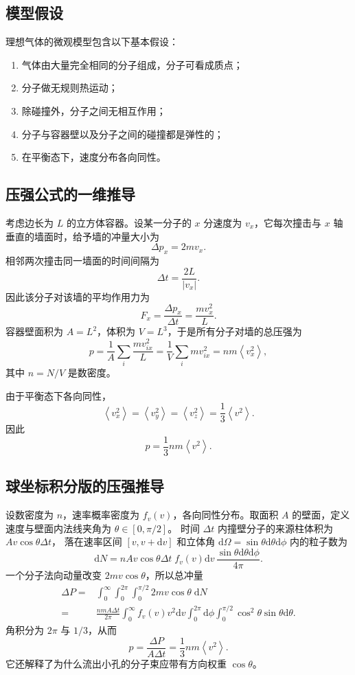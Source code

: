 \documentclass[11pt,a4paper,openany]{ctexbook}
\newcommand{\dd}{\mathrm d}
\newcommand{\avg}[1]{\left\langle #1\right\rangle}
\begin{document}
\subsection*{模型假设}
理想气体的微观模型包含以下基本假设：
\begin{enumerate}[leftmargin=2.3em]
\item 气体由大量完全相同的分子组成，分子可看成质点；
\item 分子做无规则热运动；
\item 除碰撞外，分子之间无相互作用；
\item 分子与容器壁以及分子之间的碰撞都是弹性的；
\item 在平衡态下，速度分布各向同性。
\end{enumerate}

\subsection*{压强公式的一维推导}
考虑边长为 $L$ 的立方体容器。设某一分子的 $x$ 分速度为 $v_x$，它每次撞击与 $x$ 轴垂直的墙面时，给予墙的冲量大小为
\[
\Delta p_x=2mv_x.
\]
相邻两次撞击同一墙面的时间间隔为
\[
\Delta t=\frac{2L}{|v_x|}.
\]
因此该分子对该墙的平均作用力为
\[
F_x=\frac{\Delta p_x}{\Delta t}=\frac{mv_x^2}{L}.
\]
容器壁面积为 $A=L^2$，体积为 $V=L^3$，于是所有分子对墙的总压强为
\[
p=\frac1A\sum_i\frac{mv_{ix}^2}{L}
=\frac1V\sum_i mv_{ix}^2
=nm\avg{v_x^2},
\]
其中 $n=N/V$ 是数密度。

由于平衡态下各向同性，
\[
\avg{v_x^2}=\avg{v_y^2}=\avg{v_z^2}
=\frac13\avg{v^2}.
\]
因此
\[
\boxed{p=\frac13nm\avg{v^2}}.
\]


\subsection*{球坐标积分版的压强推导}
设数密度为 $n$，速率概率密度为 $f_v(v)$，各向同性分布。取面积 $A$ 的壁面，定义速度与壁面内法线夹角为 $\theta\in[0,\pi/2]$。
时间 $\Delta t$ 内撞壁分子的来源柱体积为 $Av\cos\theta\Delta t$，
落在速率区间 $[v,v+\dd v]$ 和立体角
$\dd\Omega=\sin\theta\dd\theta\dd\phi$ 内的粒子数为
\[
\dd N=nAv\cos\theta\Delta t\;
f_v(v)\dd v\,\frac{\sin\theta\dd\theta\dd\phi}{4\pi}.
\]
一个分子法向动量改变 $2mv\cos\theta$，所以总冲量
\[
\begin{aligned}
\Delta P
=&\int_0^\infty\int_0^{2\pi}\int_0^{\pi/2}
2mv\cos\theta\;\dd N\\
=&\frac{nmA\Delta t}{2\pi}
\int_0^\infty f_v(v)v^2\dd v
\int_0^{2\pi}\dd\phi
\int_0^{\pi/2}\cos^2\theta\sin\theta\dd\theta.
\end{aligned}
\]
角积分为 $2\pi$ 与 $1/3$，从而
\[
\boxed{p=\frac{\Delta P}{A\Delta t}=\frac13nm\avg{v^2}.}
\]
它还解释了为什么流出小孔的分子束应带有方向权重 $\cos\theta$。
\end{document}
